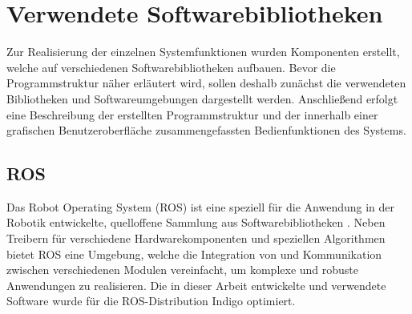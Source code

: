 
\prever{
}

\section{Verwendete Softwarebibliotheken}
Zur Realisierung der einzelnen Systemfunktionen wurden Komponenten erstellt, welche auf verschiedenen Softwarebibliotheken aufbauen.
Bevor die Programmstruktur näher erläutert wird, sollen deshalb zunächst die verwendeten Bibliotheken und Softwareumgebungen dargestellt werden.
Anschließend erfolgt eine Beschreibung der erstellten Programmstruktur und der innerhalb einer grafischen Benutzeroberfläche zusammengefassten Bedienfunktionen des Systems.

\subsection{ROS}
\label{chap:ros}
Das Robot Operating System (ROS) ist eine speziell für die Anwendung in der Robotik entwickelte, quelloffene Sammlung aus Softwarebibliotheken \cite{ROS}. Neben Treibern für verschiedene Hardwarekomponenten und speziellen Algorithmen bietet ROS eine Umgebung, welche die Integration von und Kommunikation zwischen verschiedenen Modulen vereinfacht, um komplexe und robuste Anwendungen zu realisieren. Die in dieser Arbeit entwickelte und verwendete Software wurde für die ROS-Distribution Indigo optimiert.



